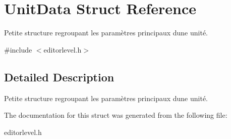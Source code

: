 \hypertarget{struct_unit_data}{}\section{Unit\+Data Struct Reference}
\label{struct_unit_data}


Petite structure regroupant les paramètres principaux d\textquotesingle{}une unité.  




{\ttfamily \#include $<$editorlevel.\+h$>$}



\subsection{Detailed Description}
Petite structure regroupant les paramètres principaux d\textquotesingle{}une unité. 

The documentation for this struct was generated from the following file\+:\begin{DoxyCompactItemize}
\item 
editorlevel.\+h\end{DoxyCompactItemize}
